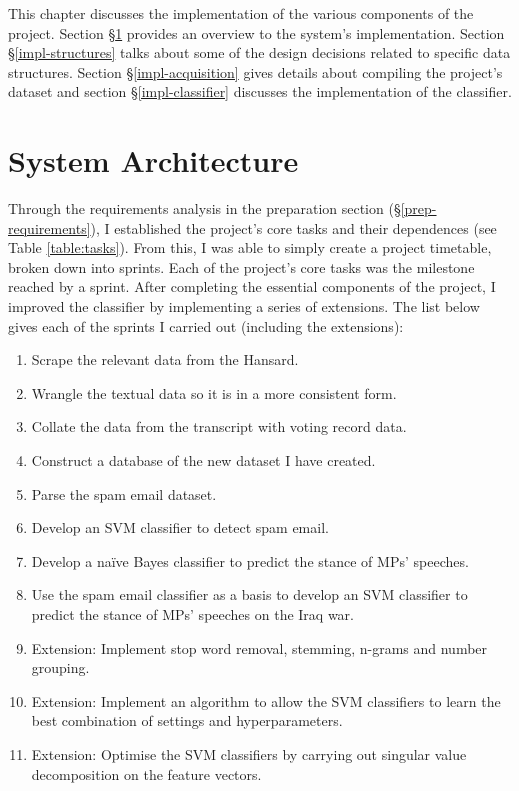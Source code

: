 \documentclass[12pt,a4paper,twoside,openright]{report}
\begin{document}
This chapter discusses the implementation of the various components of the project. Section \S\ref{impl-architecture} provides an overview to the system's implementation. Section \S\ref{impl-structures} talks about some of the design decisions related to specific data structures. Section \S\ref{impl-acquisition} gives details about compiling the project's dataset and section \S\ref{impl-classifier} discusses the implementation of the classifier.


\section{System Architecture} \label{impl-architecture}

Through the requirements analysis in the preparation section (\S\ref{prep-requirements}), I established the project's core tasks and their dependences (see Table \ref{table:tasks}). From this, I was able to simply create a project timetable, broken down into sprints. Each of the project's core tasks was the milestone reached by a sprint. After completing the essential components of the project, I improved the classifier by implementing a series of extensions. The list below gives each of the sprints I carried out (including the extensions):

\begin{enumerate}
	\item Scrape the relevant data from the Hansard.
	\item Wrangle the textual data so it is in a more consistent form.
	\item Collate the data from the transcript with voting record data.
	\item Construct a database of the new dataset I have created.
	\item Parse the spam email dataset.
	\item Develop an SVM classifier to detect spam email.
	\item Develop a na\"{i}ve Bayes classifier to predict the stance of MPs' speeches.
	\item Use the spam email classifier as a basis to develop an SVM classifier to predict the stance of MPs' speeches on the Iraq war.
	\item Extension: Implement stop word removal, stemming, n-grams and number grouping.
	\item Extension: Implement an algorithm to allow the SVM classifiers to learn the best combination of settings and hyperparameters.
	\item Extension: Optimise the SVM classifiers by carrying out singular value decomposition on the feature vectors.
\end{enumerate}
\end{document}
